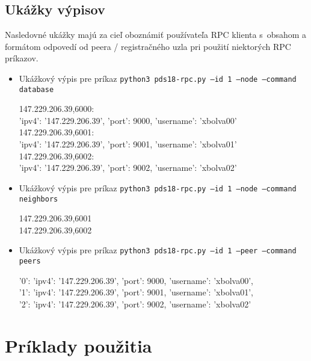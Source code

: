 \subsection{Ukážky výpisov}
Nasledovné ukážky majú za cieľ oboznámiť používateľa RPC klienta s~obsahom a formátom odpovedí od peera / registračného uzla pri použití niektorých RPC príkazov.

\begin{itemize}
	\item Ukážkový výpis pre príkaz \texttt{python3 pds18-rpc.py --id 1 --node --command database}
	\begin{framed}
	147.229.206.39,6000:\\
	{'ipv4': '147.229.206.39', 'port': 9000, 'username': 'xbolva00'}\\
	147.229.206.39,6001:\\
	{'ipv4': '147.229.206.39', 'port': 9001, 'username': 'xbolva01'}\\
	147.229.206.39,6002:\\
	{'ipv4': '147.229.206.39', 'port': 9002, 'username': 'xbolva02'}\\
	\end{framed}

	\item Ukážkový výpis pre príkaz  \texttt{python3 pds18-rpc.py --id 1 --node --command neighbors}
	\begin{framed}
		147.229.206.39,6001\\
		147.229.206.39,6002
	\end{framed}

	\item Ukážkový výpis pre príkaz  \texttt{python3 pds18-rpc.py --id 1 --peer --command peers}
	\begin{framed}
		'0': {'ipv4': '147.229.206.39', 'port': 9000, 'username': 'xbolva00'}, \\
		'1': {'ipv4': '147.229.206.39', 'port': 9001, 'username': 'xbolva01'}, \\
		'2': {'ipv4': '147.229.206.39', 'port': 9002, 'username': 'xbolva02'}
	\end{framed}
\end{itemize}

\section{Príklady použitia}

